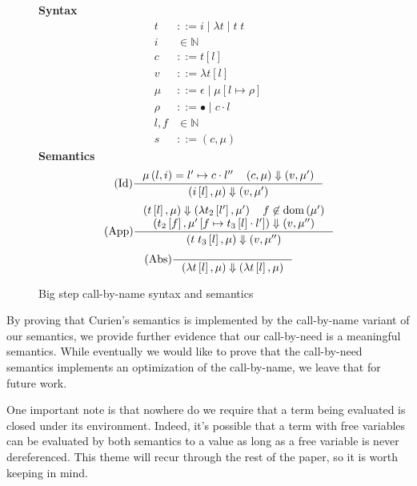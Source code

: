 \begin{figure}
\textbf{Syntax}
\begin{align*}
\tag{Term} t &::= i \; | \; \lambda t \; | \; t \; t  \\
\tag{Variable} i &\in \mathbb{N}  \\
\tag{Closure} c &::= t \left[l\right] \\
\tag{Value} v &::= \lambda t \left[l\right] \\
\tag{Heap} \mu &::= \epsilon \; | \; \mu \left[ l \mapsto \rho \right] \\
\tag{Environment} \rho &::= \bullet \; | \; c \cdot l \\
\tag{Location} l,f &\in \mathbb{N}  \\
\tag{Configuration} s &::= \left(c, \mu \right)
\end{align*}
\textbf{Semantics}
\begin{align*}
\tag{Id} \inference
{\mu \left( l, i \right) = l' \mapsto c \cdot l'' \quad 
 \left(c, \mu\right) \Downarrow \left(v, \mu'\right)}
{\left(i\left[l\right],\mu\right) \Downarrow \left(v, \mu'\right)}
\end{align*}
\begin{align*}
\tag{App} \inference
{\left(t\left[l\right], \mu\right) \Downarrow \left(\lambda t_2\left[l'\right], \mu'\right) 
   \quad f \not \in \textnormal{dom}\left(\mu'\right)
   \\ \left(t_2\left[f\right], \mu'\left[f \mapsto t_3\left[l\right] \cdot l'\right]\right)
         \Downarrow 
      \left(v, \mu'' \right) 
   }
{\left(t \; t_3\left[l\right], \mu\right) \Downarrow \left(v, \mu'' \right)}  
\end{align*}
\begin{align*}
\tag{Abs} \inference {} {\left(\lambda t\left[l\right], \mu\right) \Downarrow \left(\lambda t\left[l\right], \mu\right)}
\end{align*}
\caption{Big step call-by-name \ce syntax and semantics}
\label{fig:bigstepname}
\end{figure}

By proving that Curien's semantics is implemented by the call-by-name variant of
our semantics, we provide further evidence that our call-by-need is a
meaningful semantics. While eventually we would like to prove that the
call-by-need semantics implements an optimization of the call-by-name, we leave
that for future work.

One important note is that nowhere do we require that a term being evaluated is
closed under its environment. Indeed, it's possible that a term with free variables
can be evaluated by both semantics to a value as long as a free variable is
never dereferenced. This theme will recur through the rest of the paper, so it
is worth keeping in mind.  
